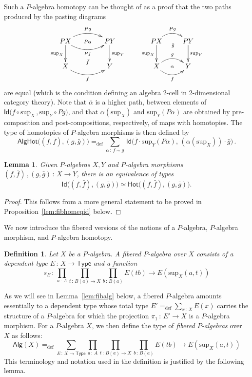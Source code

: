 \documentclass[10pt,a4paper,oneside,reqno]{amsart}
\theoremstyle{mythm}
\newtheorem{lemma}[theorem]{Lemma}
\theoremstyle{mydef}
\newtheorem{definition}[theorem]{Definition}
\theoremstyle{myrmk}
\newcommand{\defeq}{=_{\mathrm{def}}}
\newcommand{\co}{\,{:}\,}
\newcommand{\Hot}{\mathsf{Hot}}
\newcommand{\Id}{\mathsf{Id}}
\newcommand{\U}{\mathsf{Type}}
\newcommand{\Palg}{\mathsf{Alg}}
\renewcommand{\sup}{\mathrm{sup}}
\newcommand{\AlgHot}{\mathsf{AlgHot}}
\begin{document}
Such a $P$-algebra homotopy can be thought of as a proof that the two paths produced by the pasting diagrams
\[
\xymatrix@C=1.5cm{
PX \ar@/^1pc/[r]^{Pg}   \ar[d]_{\sup_X}   \ar@/_1pc/[r]_{Pf} \ar@{}[r]|{P\alpha}
& PY \ar[d]^{\sup_Y}  \\
X  \ar@/_1pc/[r]_f  \ar@{}[r]^{\bar{f}} & Y }
\qquad
\xymatrix{
PX \ar@/^1pc/[r]^{Pg}   \ar[d]_{\sup_X} \ar@{}[r]_(.52){\bar{g}}  & PY \ar[d]^{\sup_Y}  \\
X \ar@/^1pc/[r]^g  \ar@/_1pc/[r]_f  \ar@{}[r]|{\alpha} & Y }
\]
are equal (which is the condition defining an algebra 2-cell in 2-dimensional category theory). Note that $\bar{\alpha}$ is a higher path, between elements of 
$\Id \big( f \circ \sup_X \, ,  \sup_Y \circ Pg \big)$, and that $\alpha(\sup_X)$ and $\sup_Y(P \alpha)$ are obtained by pre-composition and post-compositions, respectively, of maps with homotopies.  The type of homotopies of $P$-algebra morphisms is then defined by
\[
\AlgHot \big( (f,\bar{f}), (g, \bar{g})  \big)
 \defeq  
\sum_{\alpha \co  f \sim g} \, \Id\big( \bar{f} \cdot \sup_Y(P \alpha),\, (\alpha(\sup_X))\cdot \bar{g} \big) \, .
\]




\begin{lemma}\label{IdEqHo}
Given $P$-algebras $X, Y$ and $P$-algebra morphisms $(f, \bar{f}) \, , (g, \bar{g}) \co X \to Y$,  
there is an equivalence of types
\[
\Id\big((f, \bar{f}), (g, \bar{g})\big) \simeq \Hot \big((f, \bar{f}), (g, \bar{g})\big).
\]
\end{lemma}

\begin{proof}
This follows from a more general statement to be proved in Proposition~\ref{lem:fibhomeqid} below.
\end{proof}


We now introduce the fibered versions of the notions of a $P$-algebra, $P$-algebra morphism, and $P$-algebra homotopy.

\begin{definition} \label{def:fibalg}
Let $X$ be a $P$-algebra. A \emph{fibered $P$-algebra} over $X$ consists of a dependent type $E \co X \to \U$
and a function 
\[
s_E \co \prod_{a \co A} \prod_{t \co B(a) \to X}  \prod_{b \co B(a)}  E(t b)  \to E(\sup_X(a,t))
 \] 
\end{definition}


As we will see in Lemma~\ref{lem:fibalg} below, a fibered $P$-algebra amounts essentially to a dependent type whose total
type $E' \defeq \sum_{x \co X} E(x)$ carries the structure of a $P$-algebra for which the projection $\pi_1 \co E' 
\to X$ is a $P$-algebra morphism.  For a $P$-algebra $X$, we then define the type of \emph{fibered $P$-algebras} over $X$ as follows:
\[
\Palg(X) \defeq \sum_{E \co X \to \U} \prod_{a \co A} \prod_{t \co B(a) \to X} 
 \prod_{b \co B(a)}  E(t b)  \to E(\sup_X(a,t))
 \]
This terminology and notation used in the definition is justified by the following lemma. 
\end{document}
